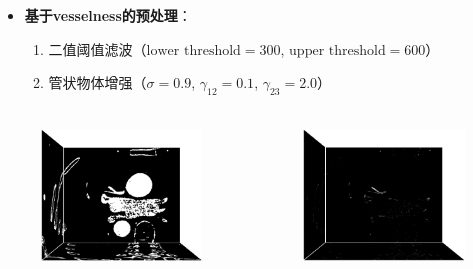 \begin{frame}
\begin{itemize}
  \item \textbf{基于vesselness的预处理}：
  \begin{enumerate}
    \item 二值阈值滤波（$\text{lower threshold} = 300$, $\text{upper threshold} = 600$）
    \item 管状物体增强（$\sigma = 0.9$, $\gamma_{12} = 0.1$, $\gamma_{23} = 2.0$）
  \end{enumerate}
\end{itemize}
\begin{columns}[b,onlytextwidth]
\begin{column}{.5\textwidth}
\begin{figure}[t]
\centering
\includegraphics[height=1.5in]{../../Figures/coronary/coronary_enhanced/binary1.eps}
\end{figure}
\end{column}
\begin{column}{.5\textwidth}
\begin{figure}[t]
\centering
\includegraphics[height=1.5in]{../../Figures/coronary/coronary_enhanced/hessian.eps}
\end{figure}
\end{column}
\end{columns}
\end{frame}

